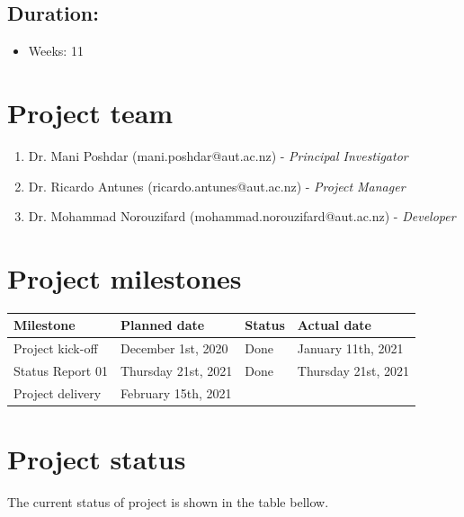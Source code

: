 \documentclass{article}
\begin{document}
\subsection{Duration:}
\label{sec:org74989cf}
\begin{itemize}
\item Weeks: 11
\end{itemize}
\section{Project team}
\label{sec:orgc4070b4}
\begin{enumerate}
\item Dr. Mani Poshdar (mani.poshdar@aut.ac.nz) - \emph{Principal Investigator}
\item Dr. Ricardo Antunes (ricardo.antunes@aut.ac.nz) - \emph{Project Manager}
\item Dr. Mohammad Norouzifard (mohammad.norouzifard@aut.ac.nz) - \emph{Developer}
\end{enumerate}


\section{Project milestones}
\label{sec:orgf7d8e55}

\begin{center}
\begin{tabular}{llll}
Milestone & Planned date & Status & Actual date\\
\hline
Project kick-off & December 1st, 2020 & Done & January 11th, 2021\\
Status Report 01 & Thursday 21st, 2021 & Done & Thursday 21st, 2021\\
Project delivery & February 15th, 2021 &  & \\
\end{tabular}
\end{center}


\section{Project status}
\label{sec:org388dd71}
The current status of project is shown in the table bellow.
\end{document}
